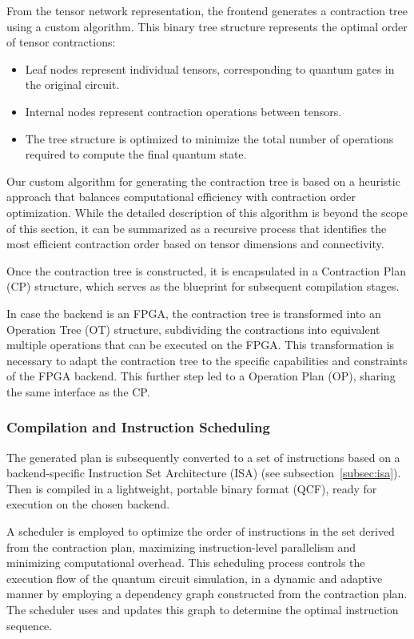\documentclass[12pt,oneside,a4paper]{article}
\begin{document}
From the tensor network representation, the frontend generates a contraction tree using a custom algorithm. This binary tree structure represents the optimal order of tensor contractions:

\begin{itemize}
    \item Leaf nodes represent individual tensors, corresponding to quantum gates in the original circuit.
    \item Internal nodes represent contraction operations between tensors.
    \item The tree structure is optimized to minimize the total number of operations required to compute the final quantum state.
\end{itemize}

Our custom algorithm for generating the contraction tree is based on a heuristic approach that balances computational efficiency with contraction order optimization. While the detailed description of this algorithm is beyond the scope of this section, it can be summarized as a recursive process that identifies the most efficient contraction order based on tensor dimensions and connectivity.

Once the contraction tree is constructed, it is encapsulated in a Contraction Plan (CP) structure, which serves as the blueprint for subsequent compilation stages.

In case the backend is an FPGA, the contraction tree is transformed into an Operation Tree (OT) structure, subdividing the contractions into equivalent multiple operations that can be executed on the FPGA. This transformation is necessary to adapt the contraction tree to the specific capabilities and constraints of the FPGA backend. This further step led to a Operation Plan (OP), sharing the same interface as the CP.

\subsubsection{Compilation and Instruction Scheduling}

The generated plan is subsequently converted to a set of instructions based on a backend-specific Instruction Set Architecture (ISA) (see subsection~\ref{subsec:isa}). Then is compiled in a lightweight, portable binary format (QCF), ready for execution on the chosen backend.

A scheduler is employed to optimize the order of instructions in the set derived from the contraction plan, maximizing instruction-level parallelism and minimizing computational overhead. This scheduling process controls the execution flow of the quantum circuit simulation, in a dynamic and adaptive manner by employing a dependency graph constructed from the contraction plan. The scheduler uses and updates this graph to determine the optimal instruction sequence.
\end{document}
